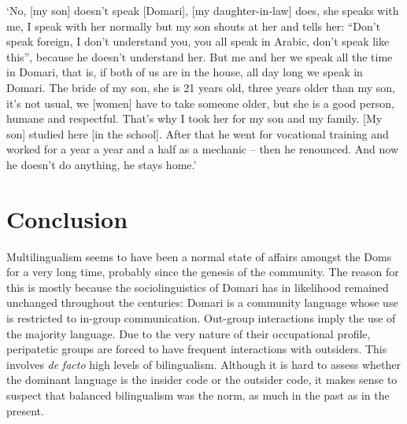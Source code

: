 \documentclass[output=paper]{langsci/langscibook}
\begin{document}
\glt ‘No, [my son] doesn’t speak [Domari], [my daughter-in-law] does, she speaks with me, I speak with her normally but my son shouts at her and tells her: “Don’t speak foreign, I don’t understand you, you all speak in Arabic, don’t speak like this”, because he doesn’t understand her. But me and her we speak all the time in Domari, that is, if both of us are in the house, all day long we speak in Domari. The bride of my son, she is 21 years old, three years older than my son, it’s not usual, we [women] have to take someone older, but she is a good person, humane and respectful. That’s why I took her for my son and my family. [My son] studied here [in the school]. After that he went for vocational training and worked for a year a year and a half as a mechanic -- then he renounced. And now he doesn’t do anything, he stays home.’ 
\z

\section{Conclusion}

Multilingualism seems to have been a normal state of affairs amongst the Doms for a very long time, probably since the genesis of the community. The reason for this is mostly because the sociolinguistics of Domari has in likelihood remained unchanged throughout the centuries: Domari is a community language whose use is restricted to in-group communication. Out-group interactions imply the use of the majority language. Due to the very nature of their occupational profile, peripatetic groups are forced to have frequent interactions with outsiders. This involves \textit{de} \textit{facto} high levels of bilingualism. Although it is hard to assess whether the dominant language is the insider code or the outsider code, it makes sense to suspect that balanced bilingualism was the norm, as much in the past as in the present.
\end{document}
